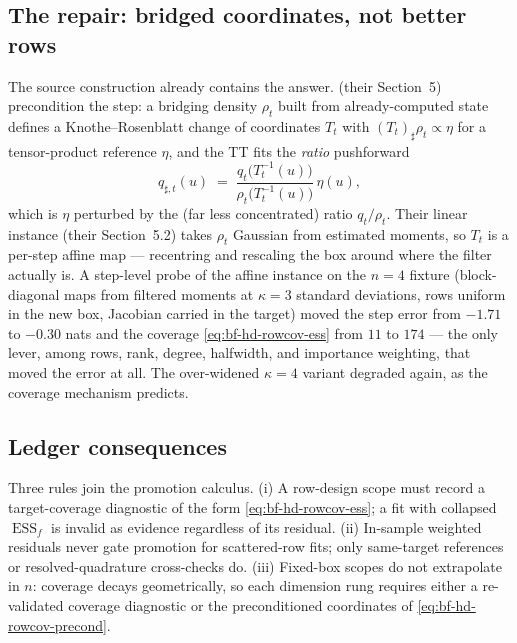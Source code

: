\subsection{The repair: bridged coordinates, not better rows}

The source construction already contains the answer.
\citet{zhao2024ttsequential} (their Section~5) precondition the step: a
bridging density \(\rho_t\) built from already-computed state defines a
Knothe--Rosenblatt change of coordinates \(T_t\) with
\((T_t)_\sharp\rho_t\propto\eta\) for a tensor-product reference \(\eta\),
and the TT fits the \emph{ratio} pushforward
\begin{equation}
  q_{\sharp,t}(u)\;=\;
  \frac{q_t\bigl(T_t^{-1}(u)\bigr)}{\rho_t\bigl(T_t^{-1}(u)\bigr)}\,
  \eta(u),
  \label{eq:bf-hd-rowcov-precond}
\end{equation}
which is \(\eta\) perturbed by the (far less concentrated) ratio
\(q_t/\rho_t\).  Their linear instance (their Section~5.2) takes
\(\rho_t\) Gaussian from estimated moments, so \(T_t\) is a per-step affine
map --- recentring and rescaling the box around where the filter actually
is.  A step-level probe of the affine instance on the \(n=4\) fixture
(block-diagonal maps from filtered moments at \(\kappa=3\) standard
deviations, rows uniform in the new box, Jacobian carried in the target)
moved the step error from \(-1.71\) to \(-0.30\) nats and the coverage
\eqref{eq:bf-hd-rowcov-ess} from \(11\) to \(174\) --- the only lever, among
rows, rank, degree, halfwidth, and importance weighting, that moved the
error at all.  The over-widened \(\kappa=4\) variant degraded again, as the
coverage mechanism predicts.

\subsection{Ledger consequences}

Three rules join the promotion calculus.  (i) A row-design scope must
record a target-coverage diagnostic of the form
\eqref{eq:bf-hd-rowcov-ess}; a fit with collapsed \(\operatorname{ESS}_f\)
is invalid as evidence regardless of its residual.  (ii) In-sample weighted
residuals never gate promotion for scattered-row fits; only same-target
references or resolved-quadrature cross-checks do.  (iii) Fixed-box scopes
do not extrapolate in \(n\): coverage decays geometrically, so each
dimension rung requires either a re-validated coverage diagnostic or the
preconditioned coordinates of \eqref{eq:bf-hd-rowcov-precond}.

